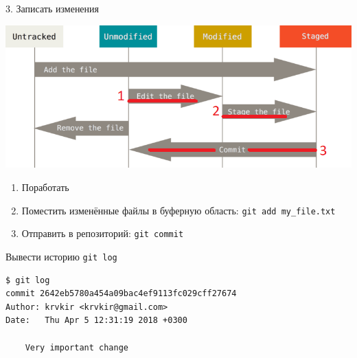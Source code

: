 \documentclass[presentation]{beamer}
\begin{document}
\begin{frame}[fragile,label={sec:org3226340}]{3. Записать изменения}
 \begin{center}
\includegraphics[height=0.5\textheight]{./01_vcs_01_git_file_states_02_change.png}
\end{center}

\begin{enumerate}
\item Поработать
\item Поместить изменённые файлы в буферную область: \texttt{git add my\_file.txt}
\item Отправить в репозиторий: \texttt{git commit}
\end{enumerate}
\end{frame}

\begin{frame}[fragile,label={sec:org36aa1f3}]{ Вывести историю}
 \alert{\texttt{git log}}

\begin{verbatim}
$ git log
commit 2642eb5780a454a09bac4ef9113fc029cff27674
Author: krvkir <krvkir@gmail.com>
Date:   Thu Apr 5 12:31:19 2018 +0300

    Very important change
\end{verbatim}
\end{frame}
\end{document}
